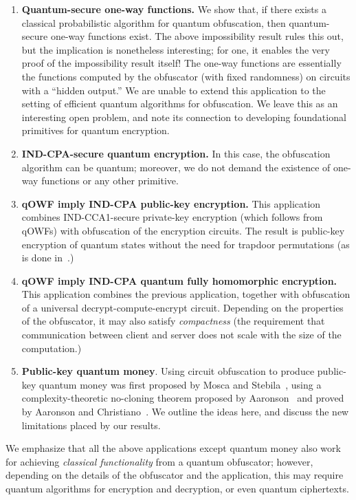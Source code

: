 \documentclass[11pt]{article}
\numberwithin{equation}{section}
\begin{document}
{\begin{enumerate}
\item \textbf{Quantum-secure one-way functions.} We show that, if there exists a classical probabilistic algorithm for quantum obfuscation, then quantum-secure one-way functions exist. The above impossibility result rules this out, but the implication is nonetheless interesting; for one, it enables the very proof of the impossibility result itself! The one-way functions are essentially the functions computed by the obfuscator (with fixed randomness) on circuits with a ``hidden output.'' We are unable to extend this application to the setting of efficient quantum algorithms for obfuscation. We leave this as an interesting open problem, and note its connection to developing foundational primitives for quantum encryption.
\item \textbf{IND-CPA-secure quantum encryption.} In this case, the obfuscation algorithm can be quantum; moreover, we do not demand the existence of one-way functions or any other primitive.
\item \textbf{qOWF imply IND-CPA public-key encryption.} This application combines IND-CCA1-secure private-key encryption (which follows from qOWFs) with obfuscation of the encryption circuits. The result is public-key encryption of quantum states without the need for trapdoor permutations (as is done in~\cite{ABFGSS15}.)
\item \textbf{qOWF imply IND-CPA quantum fully homomorphic encryption.} This application combines the previous application, together with obfuscation of a universal decrypt-compute-encrypt circuit. Depending on the properties of the obfuscator, it may also satisfy \emph{compactness} (the requirement that communication between client and server does not scale with the size of the computation.)
\item \textbf{Public-key quantum money}. Using circuit obfuscation to produce public-key quantum money was first proposed by Mosca and Stebila~\cite{MS10}, using a complexity-theoretic no-cloning theorem proposed by Aaronson~\cite{Aar09} and proved by Aaronson and Christiano~\cite{AC12}. We outline the ideas here, and discuss the new limitations placed by our results.
\end{enumerate}

We emphasize that all the above applications except quantum money also work for achieving \emph{classical functionality} from a quantum obfuscator; however, depending on the details of the obfuscator and the application, this may require quantum algorithms for encryption and decryption, or even quantum ciphertexts.


}
\end{document}
